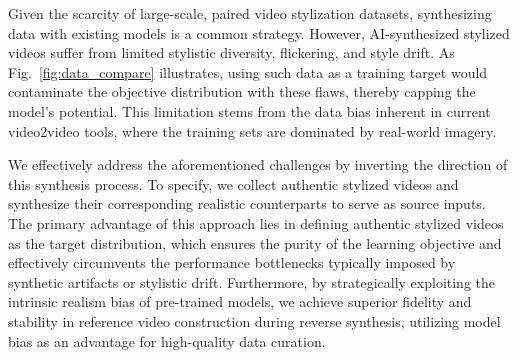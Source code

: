 \documentclass[runningheads]{llncs}
\begin{document}
Given the scarcity of large-scale, paired video stylization datasets, synthesizing data with existing models is a common strategy.
However, AI-synthesized stylized videos suffer from limited stylistic diversity, flickering, and style drift. As Fig.~\ref{fig:data_compare} illustrates, using such data as a training target would contaminate the objective distribution with these flaws, thereby capping the model's potential. This limitation stems from the data bias inherent in current video2video tools, where the training sets are dominated by real-world imagery. 

We effectively address the aforementioned challenges by inverting the direction of this synthesis process. To specify, we collect authentic stylized videos and synthesize their corresponding realistic counterparts to serve as source inputs. 
The primary advantage of this approach lies in defining authentic stylized videos as the target distribution, which ensures the purity of the learning objective and effectively circumvents the performance bottlenecks typically imposed by synthetic artifacts or stylistic drift. 
Furthermore, by strategically exploiting the intrinsic realism bias of pre-trained models, we achieve superior fidelity and stability in reference video construction during reverse synthesis, utilizing model bias as an advantage for high-quality data curation.
\end{document}
